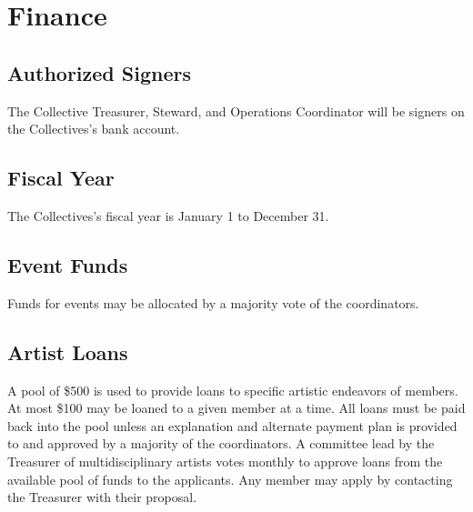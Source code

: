 \chapter{Finance}

\section{Authorized Signers}\label{sec:authorized_signers}
The Collective Treasurer, Steward, and Operations Coordinator will be signers on the Collectives's bank account.

\section{Fiscal Year}\label{sec:fiscal_year}
The Collectives's fiscal year is January 1 to December 31.

\section{Event Funds}\label{sec:event_funds}
Funds for events may be allocated by a majority vote of the coordinators.

\section{Artist Loans}\label{sec:artist_loans}
A pool of \$500 is used to provide loans to specific artistic endeavors of members. At most \$100 may be loaned to a given member at a time. All loans must be paid back into the pool unless an explanation and alternate payment plan is provided to and approved by a majority of the coordinators. A committee lead by the Treasurer of multidisciplinary artists votes monthly to approve loans from the available pool of funds to the applicants. Any member may apply by contacting the Treasurer with their proposal.
